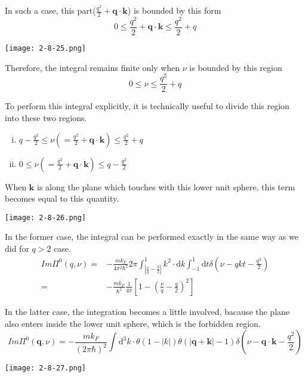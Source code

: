 In such a case, this part($\frac{q^2}{2} + \mathbf{q} \cdot \mathbf{k}$) is bounded by this form
\[ 0 \leq \frac{q^2}{2} + \mathbf{q} \cdot \mathbf{k} \leq \frac{q^2}{2} + q \]
\begin{center}\label{Fig2.8.25}
\texttt{[image: 2-8-25.png]}
\end{center}

Therefore, the integral remains finite only when $\nu$ is bounded by this region
\[ 0 \leq \nu \leq \frac{q^2}{2} + q \]

To perform this integral explicitly, it is technically useful to divide this region into these two regions.
\begin{enumerate}[(i)]
\item $q-\frac{q^2}{2} \leq \nu(=\frac{q^2}{2}+\mathbf{q}\cdot\mathbf{k}) \leq \frac{q^2}{2} + q$
\item $0\leq \nu(=\frac{q^2}{2}+\mathbf{q}\cdot\mathbf{k}) \leq q - \frac{q^2}{2}$
\end{enumerate}

When $\mathbf{k}$ is along the plane which touches with this lower unit sphere, this term becomes equal to this quantity.
\begin{center}\label{Fig2.8.26}
\texttt{[image: 2-8-26.png]}
\end{center}

In the former case, the integral can be performed exactly in the same way as we did for $q>2$ case.
\begin{equation} \label{Eqs2.8.22} \begin{split}
Im\Pi^0(q,\nu) =& -\frac{m k_F}{4\pi^2 \hbar^2} 2\pi \int_{|\frac{\nu}{q} - \frac{q}{2}|}^{1} k^2  \cdot \mathrm{d} k \int_{-1}^{1} \mathrm{d} t \delta(\nu - qkt - \frac{q^2}{2})\\
=& - \frac{m k_F}{\hbar^2}\frac{1}{4\pi} \left[ 1-\left( \frac{\nu}{q}-\frac{q}{2} \right)^2 \right]
\end{split}\end{equation}

In the latter case, the integration becomes a little involved, bacause the plane also enters inside the lower unit sphere, which is the forbidden region.
\[ Im\Pi^0(\mathbf{q},\nu) = -\frac{m k_F}{(2\pi \hbar)^2} \int \mathrm{d}^3 k \cdot \theta(1-|k|) \theta(|\mathbf{q}+\mathbf{k}|-1) \delta(\nu-\mathbf{q}\cdot\mathbf{k}-\frac{q^2}{2})
\]

\begin{center}\label{Fig2.8.27}
\texttt{[image: 2-8-27.png]}
\end{center}

